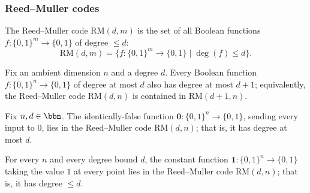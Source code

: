 \subsubsection{Reed--Muller codes}

\begin{definition}
\label{LowDegreeTest.ReedMuller}
\leanok
{}
The Reed--Muller code $\mathrm{RM}(d, m)$ is the set of all Boolean functions
$f : \{0,1\}^m \to \{0,1\}$ of degree $\le d$:
\[
  \mathrm{RM}(d, m) = \{ f : \{0,1\}^m \to \{0,1\} \mid \deg(f) \le d \}.
\]
\end{definition}

\begin{lemma}
\label{LowDegreeTest.ReedMuller_monotone}
\leanok
{}
Fix an ambient dimension $n$ and a degree $d$. Every Boolean function $f : \{0,1\}^n \to
\{0,1\}$ of degree at most $d$ also has degree at most $d+1$; equivalently, the
Reed–Muller code $\mathrm{RM}(d,n)$ is contained in $\mathrm{RM}(d+1,n)$.
\end{lemma}

\begin{lemma}
\label{LowDegreeTest.zero_mem_ReedMuller}
\leanok
{}
Fix $n, d \in \bbn$. The identically-false function $\mathbf{0} : \{0,1\}^n \to
\{0,1\}$, sending every input to $0$, lies in the Reed--Muller code $\mathrm{RM}(d, n)$;
that is, it has degree at most $d$.
\end{lemma}

\begin{lemma}
\label{LowDegreeTest.one_mem_ReedMuller}
\leanok
{}
For every $n$ and every degree bound $d$, the constant function $\mathbf{1} : \{0,1\}^n
\to \{0,1\}$ taking the value $1$ at every point lies in the Reed--Muller code
$\mathrm{RM}(d, n)$; that is, it has degree $\le d$.
\end{lemma}


